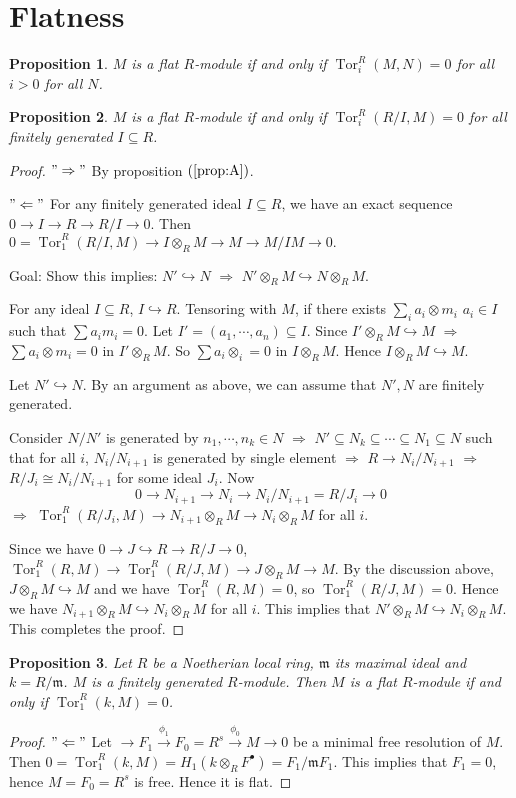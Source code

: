 \documentclass[cs4size]{article}
\newcommand{\su}{\subseteq}
\newcommand{\frm}{\mathfrak{m}}
\newcommand{\ra}{\rightarrow}
\newcommand{\xr}{\xrightarrow}
\newcommand{\Ra}{\Rightarrow}
\DeclareMathOperator{\Tor}{Tor}
\newtheorem{prop}{Proposition}
\begin{document}
\section{Flatness}
\begin{prop}\label{prop:A}
$M$ is a flat $R$-module if and only if $\Tor_i^R(M,N)=0$ for all $i>0$ for all $N$.
\end{prop}
\begin{prop}
$M$ is a flat $R$-module if and only if $\Tor_i^R(R/I,M)=0$ for all finitely generated $I\su R$.
\end{prop}
\begin{proof}
$"\Rightarrow"$ By proposition $(\ref{prop:A})$.

$"\Leftarrow"$ For any finitely generated ideal $I\su R$, we have an exact sequence $0\ra I\ra R\ra R/I\ra 0$. Then $0=\Tor_1^R(R/I,M)\ra I\otimes_RM\ra M\ra M/IM\ra 0.$

Goal: Show this implies: $N'\hookrightarrow N$ $\Ra$ $N'\otimes_RM\hookrightarrow N\otimes_RM$.

For any ideal $I\su R$, $I\hookrightarrow R$. Tensoring with $M$, if there exists $\sum_ia_i\otimes m_i$ $a_i\in I$ such that $\sum a_im_i=0$. Let $I'=(a_1,\cdots,a_n)\su I$. Since $I'\otimes_RM\hookrightarrow M$ $\Ra$ $\sum a_i\otimes m_i=0$ in $I'\otimes_RM$. So $\sum a_i\otimes _i=0$ in $I\otimes_RM$. Hence $I\otimes_RM\hookrightarrow M$.

Let $N'\hookrightarrow N$. By an argument as above, we can assume that $N',N$ are finitely generated.

Consider $N/N'$ is generated by $n_1,\cdots,n_k\in N$ $\Ra$ $N'\su N_k\su\cdots \su N_1\su N$ such that for all $i$, $N_i/N_{i+1}$ is generated by single element $\Ra$ $R\ra N_i/N_{i+1}$ $\Ra$ $R/J_i\cong N_i/N_{i+1}$ for some ideal $J_i$. Now \[0\ra N_{i+1}\ra N_i\ra N_i/N_{i+1}=R/J_i\ra 0\] $\Ra$ $\Tor_1^R(R/J_i,M)\ra N_{i+1}\otimes_RM\ra N_i\otimes_RM$ for all $i$.

Since we have $0\ra J\hookrightarrow R\ra R/J\ra 0$, $\Tor_1^R(R,M)\ra \Tor_1^R(R/J,M)\ra J\otimes_RM\ra M$.
By the discussion above, $J\otimes_RM\hookrightarrow M$ and we have $\Tor_1^R(R,M)=0$, so $\Tor_1^R(R/J,M)=0$. Hence we have $N_{i+1}\otimes_RM\hookrightarrow N_i\otimes_RM$ for all $i$. This implies that $N'\otimes_RM\hookrightarrow N_i\otimes_RM$. This completes the proof.
\end{proof}

\begin{prop}
Let $R$ be a Noetherian local ring, $\frm$ its maximal ideal and $k=R/\frm$. $M$ is a finitely generated $R$-module. Then $M$ is a flat $R$-module if and only if $\Tor_1^R(k,M)=0$.
\end{prop}
\begin{proof}
$"\Leftarrow"$ Let $\ra F_1\xr{\phi_1} F_0=R^s\xr{\phi_0} M\ra 0$ be a minimal free resolution of $M$. Then $0=\Tor_1^R(k,M)=H_1(k\otimes_RF^{\bullet})=F_1/\frm F_1$. This implies that $F_1=0$, hence $M=F_0=R^s$ is free. Hence it is flat.
\end{proof}
\end{document}
